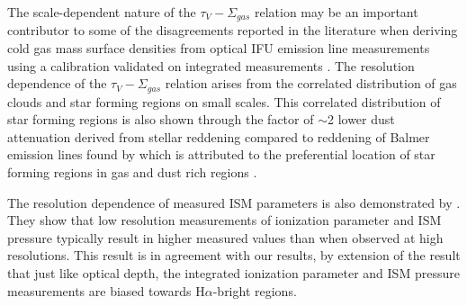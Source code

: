 \documentclass[fleqn,usenatbib]{mnras}
\begin{document}
The scale-dependent nature of the $\tau_V - \Sigma_{gas}$ relation may be an important contributor to some of the disagreements reported in the literature when deriving cold gas mass surface densities from optical IFU emission line measurements using a calibration validated on integrated measurements \cite[e.g.][]{barrera-ballesteros2020}. The resolution dependence of the  $\tau_V - \Sigma_{gas}$ relation arises from the correlated distribution of gas clouds and star forming regions on small scales. This correlated distribution of star forming regions is also shown through the factor of $\sim$2 lower dust attenuation derived from stellar reddening compared to reddening of Balmer emission lines found by \cite{kreckel2013} which is attributed to the preferential location of star forming regions in gas and dust rich regions \citep{calzetti1994, calzetti2000, charlot2000, hao2011}.

The resolution dependence of measured ISM parameters is also demonstrated by \cite{grasha2022}. They show that low resolution measurements of ionization parameter and ISM pressure typically result in higher measured values than when observed at  high resolutions. This result is in agreement with our results, by extension of the result that just like optical depth, the integrated ionization parameter and ISM pressure measurements are biased towards H$\alpha$-bright regions. 
\end{document}
